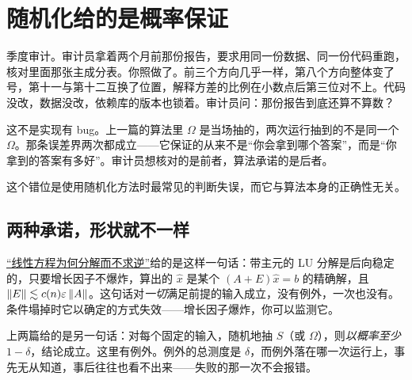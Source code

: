 \section{随机化给的是概率保证}
\label{sec:08-Numerical-Analysis/05-Numerical-Linear-Algebra/10}

季度审计。审计员拿着两个月前那份报告，要求用同一份数据、同一份代码重跑，核对里面那张主成分表。你照做了。前三个方向几乎一样，第八个方向整体变了号，第十一与第十二互换了位置，解释方差的比例在小数点后第三位对不上。代码没改，数据没改，依赖库的版本也锁着。审计员问：那份报告到底还算不算数？

这不是实现有 bug。上一篇的算法里 \(\Omega\) 是当场抽的，两次运行抽到的不是同一个 \(\Omega\)。那条误差界两次都成立——它保证的从来不是``你会拿到哪个答案''，而是``你拿到的答案有多好''。审计员想核对的是前者，算法承诺的是后者。

这个错位是使用随机化方法时最常见的判断失误，而它与算法本身的正确性无关。

\subsection{两种承诺，形状就不一样}

\hyperref[sec:08-Numerical-Analysis/05-Numerical-Linear-Algebra/01]{``线性方程为何分解而不求逆''}给的是这样一句话：带主元的 LU 分解是后向稳定的，只要增长因子不爆炸，算出的 \(\hat x\) 是某个 \((A+E)\hat x=b\) 的精确解，且 \(\left\lVert E\right\rVert\lesssim c(n)\varepsilon\left\lVert A\right\rVert\)。这句话对\emph{一切}满足前提的输入成立，没有例外，一次也没有。条件塌掉时它以确定的方式失效——增长因子爆炸，你可以监测它。

上两篇给的是另一句话：对每个固定的输入，随机地抽 \(S\)（或 \(\Omega\)），则\emph{以概率至少 \(1-\delta\)}，结论成立。这里有例外。例外的总测度是 \(\delta\)，而例外落在哪一次运行上，事先无从知道，事后往往也看不出来——失败的那一次不会报错。

